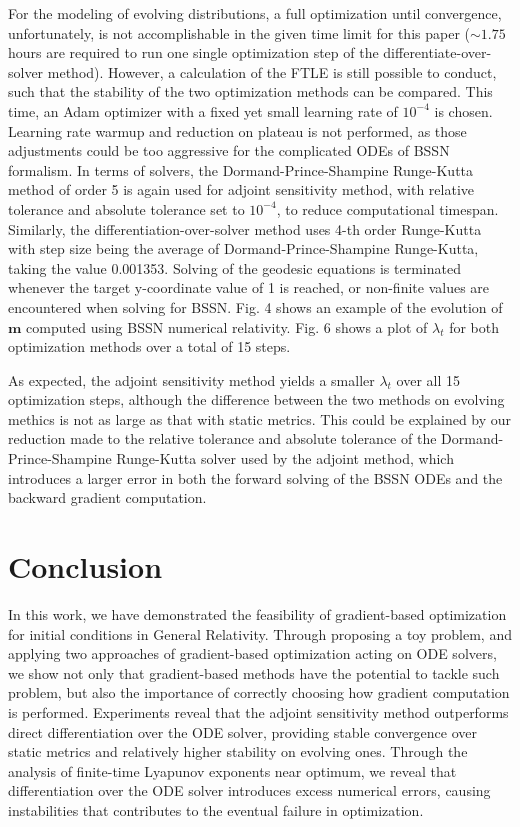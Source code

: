 \documentclass[conference]{IEEEtran}
\begin{document}
For the modeling of evolving distributions, a full optimization 
until convergence, unfortunately, is not accomplishable in 
the given time limit for this paper ($\sim1.75$ hours are required 
to run one single optimization step of the differentiate-over-solver 
method). However, a calculation of the FTLE is still possible 
to conduct, such that the stability of the two optimization 
methods can be compared. This time, an Adam optimizer with a fixed 
yet small learning rate of $10^{-4}$ is chosen. Learning rate 
warmup and reduction on plateau is not performed, as those 
adjustments could be too aggressive for the complicated ODEs of 
BSSN formalism. In terms of solvers, the Dormand-Prince-Shampine 
Runge-Kutta method of order 5 is again used for 
adjoint sensitivity method, with relative tolerance and absolute 
tolerance set to $10^{-4}$, to reduce computational timespan. 
Similarly, the differentiation-over-solver method uses 4-th order 
Runge-Kutta with step size being the average of Dormand-Prince-Shampine 
Runge-Kutta, taking the value 0.001353. Solving of the geodesic 
equations is terminated whenever the target y-coordinate value 
of 1 is reached, or non-finite values are encountered when 
solving for BSSN. Fig. 4 shows an example of the evolution of $\mathbf{m}$ 
computed using BSSN numerical relativity. Fig. 6 shows a plot of 
$\lambda_t$ for both optimization methods over a total of 15 steps.

As expected, the adjoint sensitivity method yields a smaller 
$\lambda_t$ over all 15 optimization steps, although the difference 
between the two methods on evolving methics is not as large as that with static 
metrics. This could be explained by our reduction made to 
the relative tolerance and absolute tolerance of the
Dormand-Prince-Shampine Runge-Kutta solver used by the adjoint method, which 
introduces a larger error in both the forward solving of the 
BSSN ODEs and the backward gradient computation.


\section{Conclusion}
In this work, we have demonstrated the feasibility of gradient-based 
optimization for initial conditions in General Relativity. Through 
proposing a toy problem, and applying two approaches of gradient-based 
optimization acting on ODE solvers, we show not only that gradient-based 
methods have the potential to tackle such problem, but also the 
importance of correctly choosing how gradient computation is performed. 
Experiments reveal that the adjoint sensitivity method 
outperforms direct differentiation over the ODE solver, providing 
stable convergence over static metrics and relatively higher 
stability on evolving ones. Through the analysis of finite-time Lyapunov 
exponents near optimum, we reveal that differentiation over the ODE solver 
introduces excess numerical errors, causing instabilities that 
contributes to the eventual failure in optimization.
\end{document}
